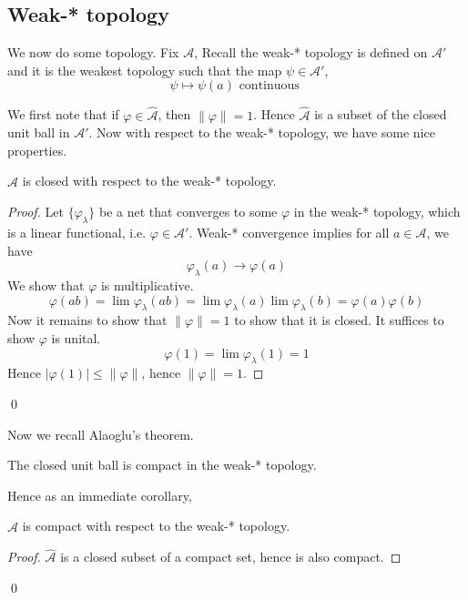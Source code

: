 \subsection{Weak-* topology}

We now do some topology. Fix $\mathcal{A}$, Recall the weak-* topology is defined on $\mathcal{A}'$ and it is the weakest topology such that the map $\psi\in\mathcal{A}'$,
\begin{equation*}
    \psi\mapsto \psi(a) \text{ continuous }
\end{equation*}

We first note that if $\varphi\in\widehat{\mathcal{A}}$, then $\|\varphi\|=1$. Hence $\widehat{\mathcal{A}}$ is a subset of the closed unit ball in $\mathcal{A}'$. Now with respect to the weak-* topology, we have some nice properties.
\begin{theorem}
    $\widehat{\mathcal{A}}$ is closed with respect to the weak-* topology.
\end{theorem}
\begin{proof}
    Let $\{\varphi_\lambda\}$ be a net that converges to some $\varphi$ in the weak-* topology, which is a linear functional, i.e. $\varphi\in\mathcal{A}'$. Weak-* convergence implies for all $a\in\mathcal{A}$, we have
    \begin{equation*}
        \varphi_\lambda(a)\to \varphi(a)
    \end{equation*}
    We show that $\varphi$ is multiplicative.
    \begin{equation*}
        \varphi(ab)=\lim\varphi_\lambda(ab)=\lim\varphi_\lambda(a)\lim\varphi_\lambda(b)=\varphi(a)\varphi(b)
    \end{equation*}
    Now  it remains to show that $\|\varphi\|=1$ to show that it is closed. It suffices to show $\varphi$ is unital.
    \begin{equation*}
        \varphi(1)=\lim\varphi_\lambda(1)=1
    \end{equation*}
    Hence $|\varphi(1)|\leq\|\varphi\|$, hence $\|\varphi\|=1$.
\end{proof}
\qed

Now we recall Alaoglu's theorem.
\begin{theorem}[Alaoglu's]
    The closed unit ball is compact in the weak-* topology.
\end{theorem}

Hence as an immediate corollary,
\begin{corollary}
    $\widehat{\mathcal{A}}$ is compact with respect to the weak-* topology.
\end{corollary}
\begin{proof}
    $\widehat{\mathcal{A}}$ is a closed subset of a compact set, hence is also compact.
\end{proof}
\qed

